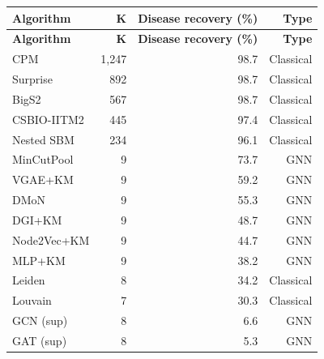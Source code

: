 
\begin{longtable}{lrrr}
\toprule
\textbf{Algorithm} & \textbf{K} & \textbf{Disease recovery (\%)} & \textbf{Type} \\
\midrule
\endfirsthead
\toprule
\textbf{Algorithm} & \textbf{K} & \textbf{Disease recovery (\%)} & \textbf{Type} \\
\midrule
\endhead

CPM & 1{,}247 & 98.7 & Classical \\
Surprise & 892 & 98.7 & Classical \\
BigS2 & 567 & 98.7 & Classical \\
CSBIO-IITM2 & 445 & 97.4 & Classical \\
Nested SBM & 234 & 96.1 & Classical \\
MinCutPool & 9 & 73.7 & GNN \\
VGAE+KM & 9 & 59.2 & GNN \\
DMoN & 9 & 55.3 & GNN \\
DGI+KM & 9 & 48.7 & GNN \\
Node2Vec+KM & 9 & 44.7 & GNN \\
MLP+KM & 9 & 38.2 & GNN \\
Leiden & 8 & 34.2 & Classical \\
Louvain & 7 & 30.3 & Classical \\
GCN (sup) & 8 & 6.6 & GNN \\
GAT (sup) & 8 & 5.3 & GNN \\

\bottomrule
\end{longtable}
